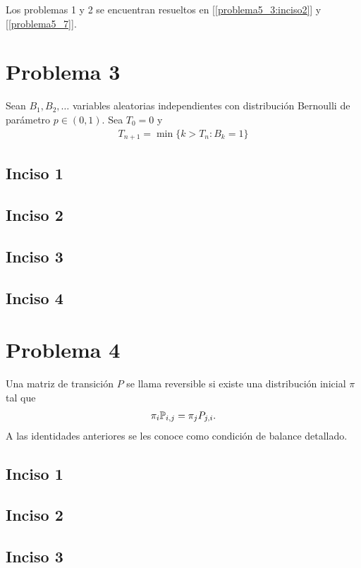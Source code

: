 Los problemas 1 y 2 se encuentran resueltos en [\ref{problema5_3:inciso2}] y [\ref{problema5_7}].

\section{Problema 3}
Sean $B_1, B_2, \dots$ variables aleatorias independientes con distribución Bernoulli de parámetro $p \in (0,1)$.
Sea $T_0 = 0$ y
\begin{align}
    T_{n+1} = \min\{k>T_n : B_k = 1\}
\end{align}
    \subsection{Inciso 1}
        
        \newpage
        
    \subsection{Inciso 2}
        
        \newpage
        
    \subsection{Inciso 3}
        
        \newpage
        
    \subsection{Inciso 4}
        
        
\section{Problema 4}
Una matriz de transición $P$ se llama reversible si existe una distribución inicial $\pi$ tal que
\begin{align}
    \pi_i \P_{i,j} = \pi_j P_{j,i}.
\end{align}
A las identidades anteriores se les conoce como condición de balance detallado.
    \subsection{Inciso 1}
        
        \newpage
        
    \subsection{Inciso 2}
        
        \newpage
        
    \subsection{Inciso 3}
        
        \newpage